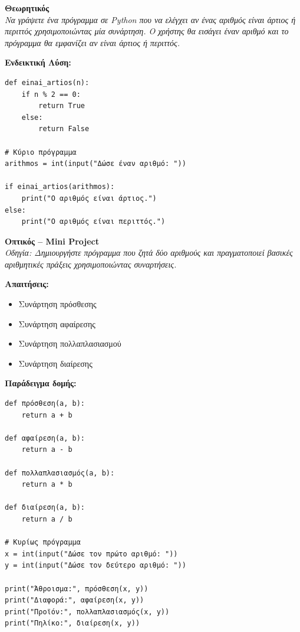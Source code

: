\documentclass[11pt]{report}
\begin{document}
\vspace{1em}
\textbf{Θεωρητικός} \\[0.5em]
\textit{Να γράψετε ένα πρόγραμμα σε Python που να ελέγχει αν ένας αριθμός είναι άρτιος ή περιττός χρησιμοποιώντας μία συνάρτηση. Ο χρήστης θα εισάγει έναν αριθμό και το πρόγραμμα θα εμφανίζει αν είναι άρτιος ή περιττός.}

\textbf{Ενδεικτική Λύση:}
\begin{tcolorbox}[colback=gray!5!white, colframe=black!75!black]
\begin{verbatim}
def einai_artios(n):
    if n % 2 == 0:
        return True
    else:
        return False

# Κύριο πρόγραμμα
arithmos = int(input("Δώσε έναν αριθμό: "))

if einai_artios(arithmos):
    print("Ο αριθμός είναι άρτιος.")
else:
    print("Ο αριθμός είναι περιττός.")
\end{verbatim}
\end{tcolorbox}

\vspace{1em}
\textbf{Οπτικός – Mini Project} \\[0.5em]
\textit{Οδηγία: Δημιουργήστε πρόγραμμα που ζητά δύο αριθμούς και πραγματοποιεί βασικές αριθμητικές πράξεις χρησιμοποιώντας συναρτήσεις.}

\textbf{Απαιτήσεις:}
\begin{itemize}
    \item Συνάρτηση πρόσθεσης
    \item Συνάρτηση αφαίρεσης
    \item Συνάρτηση πολλαπλασιασμού
    \item Συνάρτηση διαίρεσης
\end{itemize}

\textbf{Παράδειγμα δομής:}
\begin{tcolorbox}[colback=gray!5!white, colframe=black!75!black]
\begin{verbatim}
def πρόσθεση(a, b):
    return a + b

def αφαίρεση(a, b):
    return a - b

def πολλαπλασιασμός(a, b):
    return a * b

def διαίρεση(a, b):
    return a / b

# Κυρίως πρόγραμμα
x = int(input("Δώσε τον πρώτο αριθμό: "))
y = int(input("Δώσε τον δεύτερο αριθμό: "))

print("Άθροισμα:", πρόσθεση(x, y))
print("Διαφορά:", αφαίρεση(x, y))
print("Προϊόν:", πολλαπλασιασμός(x, y))
print("Πηλίκο:", διαίρεση(x, y))
\end{verbatim}
\end{tcolorbox}
\end{document}
